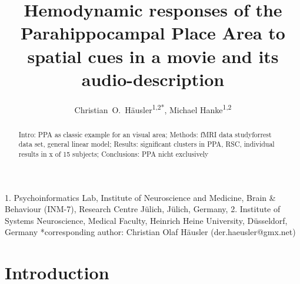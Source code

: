 \documentclass[english]{article}
\begin{document}




\title{Hemodynamic responses of the Parahippocampal Place Area to spatial cues in a movie and its audio-description}

\author{Christian~O.~Häusler\textsuperscript{1,2{*}}, Michael Hanke\textsuperscript{1,2}}

\maketitle
\thispagestyle{fancy}

1. Psychoinformatics Lab, Institute of Neuroscience and Medicine, Brain \&
Behaviour (INM-7), Research Centre Jülich, Jülich, Germany,
2. Institute of Systems Neuroscience, Medical Faculty, Heinrich Heine University,  Düsseldorf, Germany
{*}corresponding author: Christian Olaf Häusler (der.haeusler@gmx.net)

\begin{abstract}
Intro: PPA as classic example for an visual area; Methods: fMRI data
studyforrest data set, general linear model; Results: significant clusters in
PPA, RSC, individual results in x of 15 subjects; Conclusions: PPA nicht
exclusively \end{abstract}




\section{Introduction}
\end{document}
